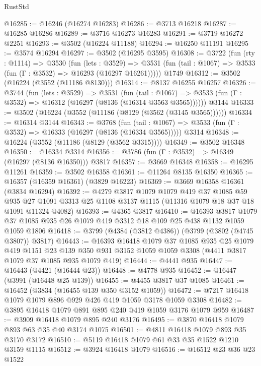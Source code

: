 \begin{lexlean}{RustStd}
\begin{coremodule}
@16285 := @16246 (@16274 @16283)
@16286 := @3713 @16218
@16287 := @16285 @16286
@16289 := @3716 @16273 @16283
@16291 := @3719 @16272 @2251
@16293 := @3502 (@16224 @11188)
@16294 := @16250 @11191
@16295 := @3574 @16294
@16297 := @3502 (@16295 @3595)
@16308 := @3722
    (fun (rty : @1114) =>
    @3530
      (fun (lets : @3529) =>
      @3531 (fun (tail : @1067) => @3533 (fun (Γ : @3532) => @16293 (@16297 @16261)))))
    @1749
@16312 := @3502 (@16224 (@3552 (@11186 @8130)))
@16314 := @8137 @16255 @16257
@16326 := @3744
    (fun (lets : @3529) =>
    @3531
      (fun (tail : @1067) =>
      @3533 (fun (Γ : @3532) => @16312 (@16297 (@8136 (@16314 @3563 @3565))))))
    @3144
@16333 := @3502 (@16224 (@3552 (@11186 (@8129 (@3562 (@3145 @3565))))))
@16334 := @16314 @3144
@16343 := @3768
    (fun (tail : @1067) => @3533 (fun (Γ : @3532) => @16333 (@16297 (@8136 (@16334 @3565)))))
    @3314
@16348 := @16224 (@3552 (@11186 (@8129 (@3562 @3315))))
@16349 := @3502 @16348
@16350 := @16334 @3314
@16356 := @3786 (fun (Γ : @3532) => @16349 (@16297 (@8136 @16350))) @3817
@16357 := @3669 @16348
@16358 := @16295 @11261
@16359 := @3502 @16358
@16361 := @11264 @8135 @16350
@16365 := @16357 (@16359 @16361) (@3829 @16223)
@16369 := @3669 @16358 @16361 (@3834 @16294)
@16392 := @4279
    @3817
    @1079
    @1079
    @419
    @37
    @1085
    @59
    @935
    @27
    @1091
    @3313
    @25
    @1108
    @3137
    @1115
    (@11316 @1079 @18 @37 @18 @1091 @11324 @4082)
@16393 := @4365 @3817
@16410 := @16393
    @3817
    @1079
    @37
    @1085
    @935
    @26
    @1079
    @419
    @3312
    @18
    @109
    @25
    @438
    @1132
    @1059
    @1059
    @1806
@16418 := @3799 (@4384 (@3812 @4386)) (@3799 (@3802 (@4745 @3807)) @3817)
@16443 := @16393
    @16418
    @1079
    @37
    @1085
    @935
    @25
    @1079
    @419
    @1151
    @23
    @139
    @350
    @931
    @3152
    @1059
    @1059
    @3308
    (@4411 @3817 @1079 @37 @1085 @935 @1079 @419)
@16444 := @4441 @935
@16447 := @16443 (@4421 (@16444 @23))
@16448 := @4778 @935
@16452 := @16447 (@3991 (@16448 @25 @139))
@16455 := @4455 @3817 @37 @1085
@16461 := @16452 (@3834 (@16455 @139 @350 @3152 @1059))
@16472 := @7217 @16418 @1079 @1079 @896 @929 @426 @419 @1059 @3178 @1059 @3308
@16482 := @3895 @16418 @1079 @891 @895 @240 @419 @1059 @3176 @1079 @959
@16487 := @3909 @16418 @1079 @895 @240 @3176
@16495 := @3870 @16418 @1079 @893 @63 @35 @40 @3174 @1075
@16501 := @4811 @16418 @1079 @893 @35 @3170 @3172
@16510 := @5119 @16418 @1079 @61 @33 @35 @1522 @1210 @3159 @1115
@16512 := @3924 @16418 @1079
@16516 := @16512 @23 @36 @23 @1522

\end{coremodule}
\end{lexlean}
